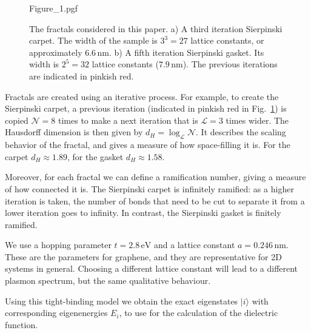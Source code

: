 \begin{figure}[h]
    \centering
    {Figure_1.pgf}
    \caption{
        The fractals considered in this paper.
        a) A third iteration Sierpinski carpet. The width of the sample is $3^3
        = 27$ lattice constants, or approximately $6.6\,\text{nm}$.
        b) A fifth iteration Sierpinski gasket. Its width is $2^5 = 32$
        lattice constants ($7.9\,\text{nm}$).
        The previous iterations are indicated in pinkish red.
    }
    \label{fig:prb18:coordinates}
\end{figure}

Fractals are created using an iterative process. For example, to create the Sierpinski carpet, a previous iteration (indicated in pinkish red in Fig.~\ref{fig:prb18:coordinates}) is copied $\mathcal{N} = 8$ times to make a next iteration that is $\mathcal{L} = 3$ times wider. The Hausdorff dimension is then given by $d_H=\log_\mathcal{L}\mathcal{N}$. It describes the scaling behavior of the fractal, and gives a measure of how space-filling it is. For the carpet $d_H \approx 1.89$, for the gasket $d_H \approx 1.58$.

Moreover, for each fractal we can define a ramification number, giving a measure of how connected it is. The Sierpinski carpet is infinitely ramified: as a higher iteration is taken, the number of bonds that need to be cut to separate it from a lower iteration goes to infinity. In contrast, the Sierpinski gasket is finitely ramified.

We use a hopping parameter $t=2.8\,\text{eV}$ and a lattice constant $a = 0.246\,\text{nm}$. These are the parameters for graphene, and they are representative for 2D systems in general. Choosing a different lattice constant will lead to a different plasmon spectrum, but the same qualitative behaviour.

Using this tight-binding model we obtain the exact eigenstates $|i\rangle$ with corresponding eigenenergies $E_i$, to use for the calculation of the dielectric function.

